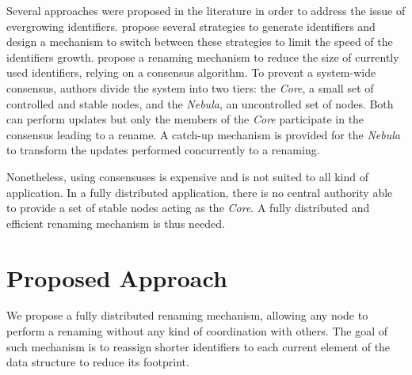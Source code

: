 \documentclass[sigplan]{acmart}
\begin{document}
Several approaches were proposed in the literature in order to address the issue of evergrowing identifiers.
\citet{nedelec_2013_lseq} propose several strategies to generate identifiers and design a mechanism to switch between these strategies to limit the speed of the identifiers growth.
\citet{leia:inria-00397981} propose a renaming mechanism to reduce the size of currently used identifiers, relying on a consensus algorithm.
To prevent a system-wide consensus, authors divide the system into two tiers: the \emph{Core}, a small set of controlled and stable nodes, and the \emph{Nebula}, an uncontrolled set of nodes.
Both can perform updates but only the members of the \emph{Core} participate in the consensus leading to a rename.
A catch-up mechanism is provided for the \emph{Nebula} to transform the updates performed concurrently to a renaming.

Nonetheless, using consensuses is expensive and is not suited to all kind of application. In a fully distributed application, there is no central authority able to provide a set of stable nodes acting as the \emph{Core}. A fully distributed and efficient renaming mechanism is thus needed.

\section{Proposed Approach}


We propose a fully distributed renaming mechanism, allowing any node to perform a renaming without any kind of coordination with others.
The goal of such mechanism is to reassign shorter identifiers to each current element of the data structure to reduce its footprint.
\end{document}

